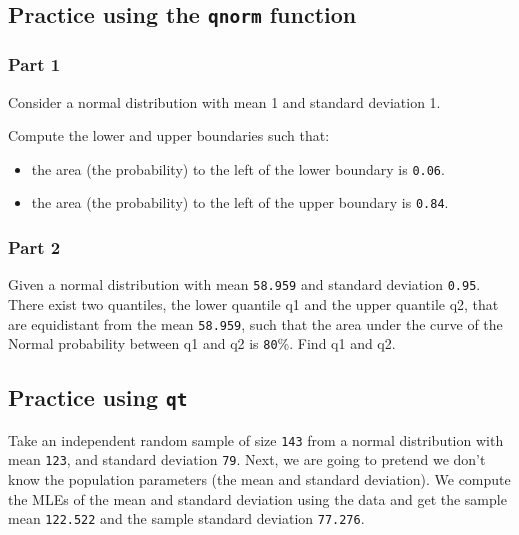 \documentclass[12pt,]{krantz}
\providecommand{\tightlist}{%
  \setlength{\itemsep}{0pt}\setlength{\parskip}{0pt}}
\begin{document}
\hypertarget{sec:Foundationsexercisesqnorm}{%
\subsection{\texorpdfstring{Practice using the \texttt{qnorm} function}{Practice using the qnorm function}}\label{sec:Foundationsexercisesqnorm}}

\hypertarget{sec:FoundationsexercisesqnormPart1}{%
\subsubsection{Part 1}\label{sec:FoundationsexercisesqnormPart1}}

Consider a normal distribution with mean 1 and standard deviation 1.

Compute the lower and upper boundaries such that:

\begin{itemize}
\tightlist
\item
  the area (the probability) to the left of the lower boundary is \texttt{0.06}.
\item
  the area (the probability) to the left of the upper boundary is \texttt{0.84}.
\end{itemize}

\hypertarget{sec:FoundationsexercisesqnormPart2}{%
\subsubsection{Part 2}\label{sec:FoundationsexercisesqnormPart2}}

Given a normal distribution with mean \texttt{58.959} and standard deviation \texttt{0.95}. There exist two quantiles, the lower quantile q1 and the upper quantile q2, that are equidistant from the mean \texttt{58.959}, such that the area under the curve of the Normal probability between q1 and q2 is \texttt{80}\%. Find q1 and q2.

\hypertarget{sec:Foundationsexercisesqt}{%
\subsection{\texorpdfstring{Practice using \texttt{qt}}{Practice using qt}}\label{sec:Foundationsexercisesqt}}

Take an independent random sample of size \texttt{143} from a normal distribution
with mean \texttt{123}, and standard deviation \texttt{79}. Next, we are going to pretend we don't know the population parameters (the mean and standard deviation). We compute the MLEs of the mean and standard deviation using the data and get the sample mean \texttt{122.522} and the sample standard deviation \texttt{77.276}.
\end{document}
